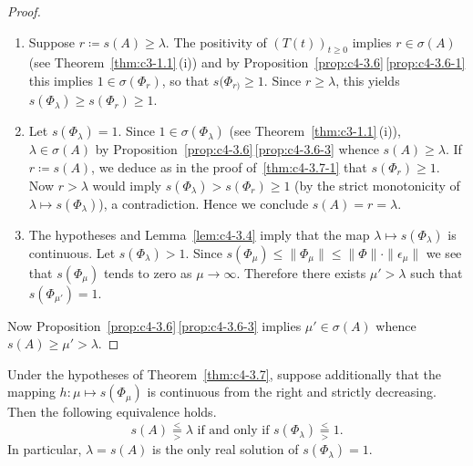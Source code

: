 \begin{proof}
\begin{enumerate}[\upshape (i), wide, labelindent=.25em] 
\item%
Suppose $r \coloneq s(A) \geq \lambda$. 
The positivity of\/ $(T(t))_{t \geq 0}$ implies $r \in \sigma(A)$ (see Theorem~\ref{thm:c3-1.1}\,(i)) and by Proposition~\ref{prop:c4-3.6}\,\ref{prop:c4-3.6-1}  this implies $1 \in \sigma(\Phi_r)$, so that $s(\Phi_{r)} \geq 1$. 
Since $r \geq \lambda$, this yields $s(\Phi_{\lambda}) \geq s(\Phi_{r}) \geq 1$.

\item 
Let $s(\Phi_{\lambda}) = 1$. 
Since $1 \in \sigma(\Phi_{\lambda})$ (see Theorem~\ref{thm:c3-1.1}\,(i)), $\lambda \in \sigma(A)$ by Proposition~\ref{prop:c4-3.6}\,\ref{prop:c4-3.6-3} whence $s(A) \geq \lambda$. 
If\/ $r \coloneq s(A)$, we deduce as in the proof of~\ref{thm:c4-3.7-1} that $s(\Phi_{r}) \geq 1$. 
Now $r > \lambda$ would imply $s(\Phi_{\lambda}) > s(\Phi_{r}) \geq 1$ (by the strict monotonicity of\/ $\lambda \mapsto s(\Phi_{\lambda})$), a contradiction. Hence we conclude $s(A) = r = \lambda$.

\item 
The hypotheses and Lemma~\ref{lem:c4-3.4} imply that the map $\lambda \mapsto s(\Phi_{\lambda})$ is continuous. 
Let $s(\Phi_{\lambda}) > 1$. 
Since $s(\Phi_{\mu}) \leq \|\Phi_{\mu}\| \leq \|\Phi\| \cdot \|\epsilon_{\mu}\|$ we see that $s(\Phi_{\mu})$ tends to zero as $\mu \to \infty$. 
Therefore there exists $\mu' > \lambda$ such that $s(\Phi_{\mu'}) = 1$. 
\end{enumerate} 
Now Proposition~\ref{prop:c4-3.6}\,\ref{prop:c4-3.6-3}  implies $\mu' \in \sigma(A)$ whence $s(A) \geq \mu' > \lambda$.
\end{proof}
\begin{corollary}\label{cor:c4-3.8}
%
Under the hypotheses of Theorem~\ref{thm:c4-3.7}, suppose additionally that the mapping $h: \mu \mapsto s(\Phi_{\mu})$ is continuous from the right and strictly decreasing. Then the following equivalence holds.
\begin{equation}\label{eq:c4-3.9}
s(A) 
\overset{<}{ \underset{>}{=} }
\lambda 
\text{ if and only if } 
s(\Phi_{\lambda}) 
\overset{<}{ \underset{>}{=} }
1 .
\end{equation}
In particular, $\lambda = s(A)$ is the only real solution of\/ $s(\Phi_{\lambda}) = 1$.
\end{corollary}
